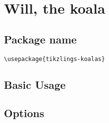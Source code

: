 \documentclass[parskip=half]{scrartcl}
\begin{document}
\begin{tcblisting}{}
\coati[rotatehead=-15]
\end{tcblisting}

\begin{tcblisting}{}
\coati[sideward]
\end{tcblisting}

\begin{tcblisting}{}
\coati[3D]
\end{tcblisting}


\clearpage
\section[\textbackslash koala]{Will, the koala}

\subsection{Package name}

\begin{tcolorbox}
\vspace*{0.5cm}
\lstinline|\usepackage{tikzlings-koalas}|
\vspace*{0.5cm}
\end{tcolorbox}

\subsection{Basic Usage}

\begin{tcblisting}{}
\koala
\end{tcblisting}

\subsection{Options}

\begin{tcblisting}{}
\koala[body=SteelBlue]
\end{tcblisting}

\begin{tcblisting}{}
\koala[blush]
\end{tcblisting}

\begin{tcblisting}{}
\koala[sleeping]
\end{tcblisting}

\begin{tcblisting}{}
\koala[3D]
\end{tcblisting}
\end{document}
